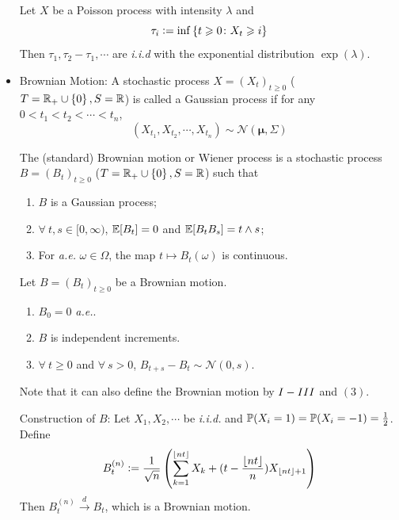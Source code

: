 \documentclass[a4paper,12pt]{article}
\begin{document}
\begin{itemize}
  \begin{thm}
    Let $X$ be a Poisson process with intensity $\lambda$ and
    \begin{equation*}
      \tau_i \vcentcolon= \inf\left\{t \geqslant 0 \colon X_t \geqslant i\right\}
    \end{equation*}
    Then $\tau_1, \tau_2-\tau_1,\cdots$ are \emph{i.i.d} with the exponential distribution $\exp(\lambda)$.
  \end{thm}

  \item Brownian Motion: A stochastic process $X=(X_t)_{t \geqslant 0}$ ($T=\mathbb{R}_+\cup\left\{0\right\},S=\mathbb{R}$) is called a Gaussian process if for any $0 < t_1 < t_2 < \cdots < t_n$, 
  \begin{equation*}
    (X_{t_1},X_{t_2},\cdots, X_{t_n}) \sim \mathcal{N}(\pmb{\mu},\Sigma)
  \end{equation*}
  
  \noindent The (standard) Brownian motion or Wiener process is a stochastic process $B = (B_t)_{t \geqslant 0}$ ($T=\mathbb{R}_+\cup\left\{0\right\},S=\mathbb{R}$) such that
  \begin{enumerate}[label=(\arabic*)]
    \item $B$ is a Gaussian process;
    \item $\forall~t,s \in [0,\infty)$, $\mathbb{E}[B_t] = 0$ and $\mathbb{E}[B_tB_s] = t \wedge s$;
    \item For \emph{a.e.} $\omega \in \Omega$, the map $t \mapsto B_t(\omega)$ is continuous.
  \end{enumerate}
  \begin{cor}
    Let $B=(B_t)_{t \geqslant 0}$ be a Brownian motion.
    \begin{enumerate}[label=\Roman*.]
      \item $B_0 = 0$ \emph{a.e.}.
      \item $B$ is independent increments.
      \item $\forall~t \geqslant 0$ and $\forall~s > 0$, $B_{t+s} - B_t \sim \mathcal{N}(0, s)$.
    \end{enumerate}
  \end{cor}
  Note that it can also define the Brownian motion by $\RNum{1}-\RNum{3}$ and $(3)$.

  \noindent Construction of $B$: Let $X_1,X_2,\cdots$ be \emph{i.i.d.} and $\mathbb{P}(X_i=1)=\mathbb{P}(X_i=-1)=\frac{1}{2}$. Define
  \begin{equation*}
    B_t^{(n)} \vcentcolon= \frac{1}{\sqrt{n}}\left(\sum_{k=1}^{\left\lfloor nt \right\rfloor}X_k + (t - \frac{\left\lfloor nt \right\rfloor}{n})X_{\left\lfloor nt \right\rfloor+1}\right)
  \end{equation*}
  Then $B_t^{(n)} \xrightarrow{d} B_t$, which is a Brownian motion.



\end{itemize}
\end{document}
